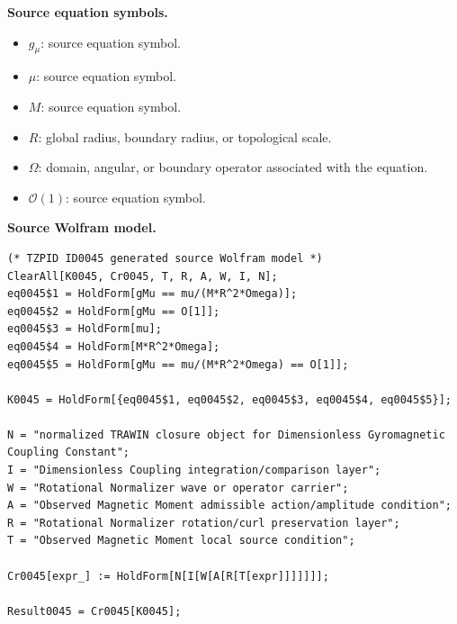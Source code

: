 \begin{minipage}[t]{0.49\linewidth}
\begingroup
\small
\raggedright
\textbf{Source equation symbols.}\par
\begin{itemize}[leftmargin=1.35em,itemsep=1pt,topsep=1pt,parsep=0pt]
    \item $g_{\mu}$: source equation symbol.
    \item $\mu$: source equation symbol.
    \item $M$: source equation symbol.
    \item $R$: global radius, boundary radius, or topological scale.
    \item $\Omega$: domain, angular, or boundary operator associated with the equation.
    \item $\mathcal{O}(1)$: source equation symbol.
\end{itemize}
\endgroup
\end{minipage}\hfill
\begin{minipage}[t]{0.47\linewidth}
\begingroup
\scriptsize
\raggedright
\textbf{Source Wolfram model.}\par
\begin{Verbatim}[fontsize=\tiny,breaklines=true,breakanywhere=true]
(* TZPID ID0045 generated source Wolfram model *)
ClearAll[K0045, Cr0045, T, R, A, W, I, N];
eq0045$1 = HoldForm[gMu == mu/(M*R^2*Omega)];
eq0045$2 = HoldForm[gMu == O[1]];
eq0045$3 = HoldForm[mu];
eq0045$4 = HoldForm[M*R^2*Omega];
eq0045$5 = HoldForm[gMu == mu/(M*R^2*Omega) == O[1]];

K0045 = HoldForm[{eq0045$1, eq0045$2, eq0045$3, eq0045$4, eq0045$5}];

N = "normalized TRAWIN closure object for Dimensionless Gyromagnetic Coupling Constant";
I = "Dimensionless Coupling integration/comparison layer";
W = "Rotational Normalizer wave or operator carrier";
A = "Observed Magnetic Moment admissible action/amplitude condition";
R = "Rotational Normalizer rotation/curl preservation layer";
T = "Observed Magnetic Moment local source condition";

Cr0045[expr_] := HoldForm[N[I[W[A[R[T[expr]]]]]]];

Result0045 = Cr0045[K0045];
\end{Verbatim}
\endgroup
\end{minipage}

